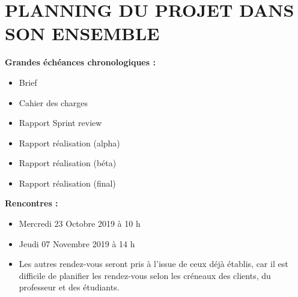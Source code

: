 \documentclass[12pt,titlepage]{report}
\begin{document}
\section{PLANNING DU PROJET DANS SON ENSEMBLE}
\vspace{\baselineskip}

\begin{justify}
\textbf{Grandes échéances chronologiques :}
\end{justify}\par

\begin{itemize}
	\item Brief\par

	\item Cahier des charges\par

	\item Rapport Sprint review\par

	\item Rapport réalisation (alpha)\par

	\item Rapport réalisation (béta)\par

	\item Rapport réalisation (final)\\
 \tab 
\end{itemize}\par

\begin{justify}
\textbf{Rencontres :}
\end{justify}\par

\begin{itemize}
	\item Mercredi 23 Octobre 2019 à 10 h \tab \tab \par

	\item Jeudi 07 Novembre 2019 à 14 h\par

	\item Les autres rendez-vous seront pris à l’issue de ceux déjà établis, car il est difficile de planifier les rendez-vous selon les créneaux des clients, du professeur et des étudiants.
\end{itemize}\par
\end{document}

